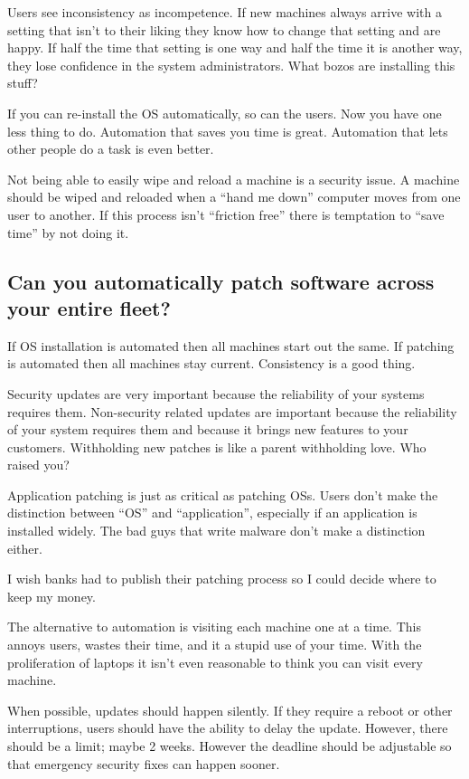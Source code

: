 \documentclass{article}
\begin{document}
Users see inconsistency as incompetence. If new machines always arrive with a setting that isn't to their liking they know how to change that setting and are happy. If half the time that setting is one way and half the time it is another way, they lose confidence in the system administrators. What bozos are installing this stuff?

If you can re-install the OS automatically, so can the users. Now you have one less thing to do. Automation that saves you time is great. Automation that lets other people do a task is even better.

Not being able to easily wipe and reload a machine is a security issue. A machine should be wiped and reloaded when a ``hand me down'' computer moves from one user to another. If this process isn't ``friction free'' there is temptation to ``save time'' by not doing it.

\subsection{Can you automatically patch software across your entire fleet?}
If OS installation is automated then all machines start out the same. If patching is automated then all machines stay current. Consistency is a good thing.

Security updates are very important because the reliability of your systems requires them. Non-security related updates are important because the reliability of your system requires them and because it brings new features to your customers. Withholding new patches is like a parent withholding love. Who raised you?

Application patching is just as critical as patching OSs. Users don't make the distinction between ``OS'' and ``application'', especially if an application is installed widely. The bad guys that write malware don't make a distinction either.

I wish banks had to publish their patching process so I could decide where to keep my money.

The alternative to automation is visiting each machine one at a time. This annoys users, wastes their time, and it a stupid use of your time. With the proliferation of laptops it isn't even reasonable to think you can visit every machine.

When possible, updates should happen silently. If they require a reboot or other interruptions, users should have the ability to delay the update. However, there should be a limit; maybe 2 weeks. However the deadline should be adjustable so that emergency security fixes can happen sooner.
\end{document}
